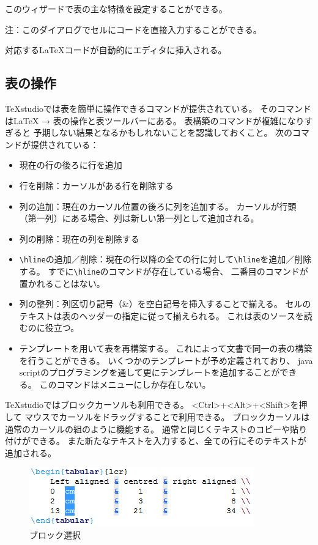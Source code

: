 このウィザードで表の主な特徴を設定することができる。

注：このダイアログでセルにコードを直接入力することができる。

対応するLaTeXコードが自動的にエディタに挿入される。

\subsection{表の操作}

TeXstudioでは表を簡単に操作できるコマンドが提供されている。
そのコマンドはLaTeX → 表の操作と表ツールバーにある。
表構築のコマンドが複雑になりすぎると
予期しない結果となるかもしれないことを認識しておくこと。
次のコマンドが提供されている：

\begin{itemize}
\item
  現在の行の後ろに行を追加
\item
  行を削除：カーソルがある行を削除する
\item
  列の追加：現在のカーソル位置の後ろに列を追加する。
  カーソルが行頭（第一列）にある場合、列は新しい第一列として追加される。
\item
  列の削除：現在の列を削除する
\item
  \verb+\hline+の追加／削除：現在の行以降の全ての行に対して\verb+\hline+を追加／削除する。
  すでに\verb+\hline+のコマンドが存在している場合、
  二番目のコマンドが置かれることはない。
\item
  列の整列：列区切り記号（\&）を空白記号を挿入することで揃える。
  セルのテキストは表のヘッダーの指定に従って揃えられる。
  これは表のソースを読むのに役立つ。
\item
  テンプレートを用いて表を再構築する。
  これによって文書で同一の表の構築を行うことができる。
  いくつかのテンプレートが予め定義されており、
  java scriptのプログラミングを通して更にテンプレートを追加することができる。
  このコマンドはメニューにしか存在しない。
\end{itemize}

TeXstudioではブロックカーソルも利用できる。
\textless{}Ctrl\textgreater{}+\textless{}Alt\textgreater{}+\textless{}Shift\textgreater{}を押して
マウスでカーソルをドラッグすることで利用できる。
ブロックカーソルは通常のカーソルの組のように機能する。
通常と同じくテキストのコピーや貼り付けができる。
また新たなテキストを入力すると、全ての行にそのテキストが追加される。

\begin{figure}[H]
  \centering
  \includegraphics{block_selection.png}
  \caption{ブロック選択}
\end{figure}

